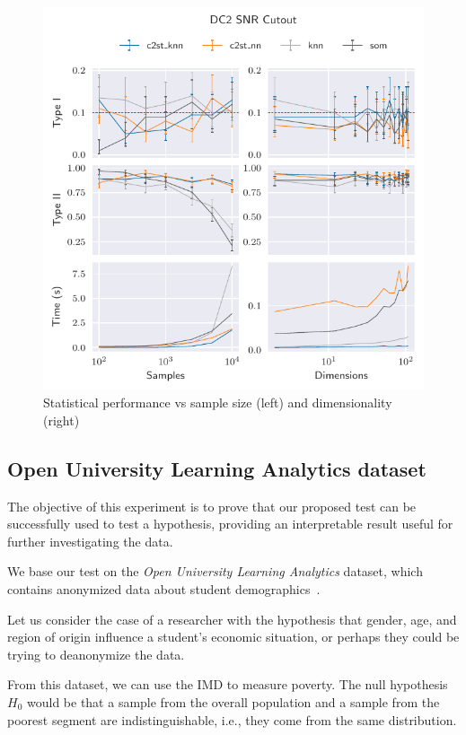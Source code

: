 \begin{figure}[htbp]
    \centering
    \includegraphics{images/6_som/dc2_snr}
    \caption{Statistical performance vs sample size (left) and dimensionality (right)}
    \label{fig:dc2_snr}
\end{figure}

\subsection{Open University Learning Analytics dataset}
\label{subsec:som_oulad}
The objective of this experiment is to prove that our proposed test can be successfully
used to test a hypothesis, providing an interpretable result useful for further
investigating the data.

We base our test on the \emph{Open University Learning Analytics}
dataset, which contains anonymized data about student demographics~\cite{kuzilek_open_2017}.

Let us consider the case of a researcher with the hypothesis that gender, age, and
region of origin influence a student's economic situation, or perhaps they could
be trying to deanonymize the data.

From this dataset, we can use the \gls{IMD} to measure poverty.
The null hypothesis $H_0$ would be that a sample from the overall population and a sample from
the poorest segment are indistinguishable, i.e., they come from the same distribution.

